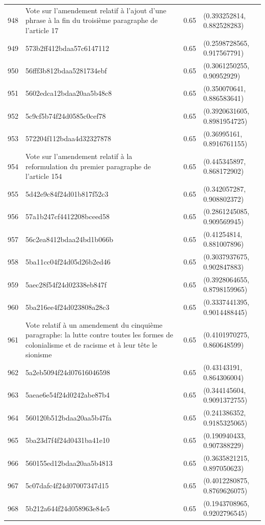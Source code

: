 \begin{table}[ht]
\begin{tabular}{rlrl}
  948 & Vote sur l'amendement relatif à l'ajout d'une phrase à la fin du troisième paragraphe de l'article 17 & 0.65 & (0.393252814, 0.882528283) \\ 
  949 & 573b2ff412bdaa57c6147112 & 0.65 & (0.2598728565, 0.917567791) \\ 
  950 & 56fff3b812bdaa5281734ebf & 0.65 & (0.3061250255, 0.90952929) \\ 
  951 & 5602edca12bdaa20aa5b48c8 & 0.65 & (0.350070641, 0.886583641) \\ 
  952 & 5c9cf5b74f24d0585c0cef78 & 0.65 & (0.3920631605, 0.8981954725) \\ 
  953 & 572204f112bdaa4d32327878 & 0.65 & (0.36995161, 0.8916761155) \\ 
  954 & Vote sur l'amendement relatif à la reformulation du premier paragraphe de l'article 154 & 0.65 & (0.445345897, 0.868172902) \\ 
  955 & 5d42e9c84f24d01b817f52c3 & 0.65 & (0.342057287, 0.908802372) \\ 
  956 & 57a1b247cf4412208bceed58 & 0.65 & (0.2861245085, 0.909569945) \\ 
  957 & 56c2ea8412bdaa24bd1b066b & 0.65 & (0.41254814, 0.881007896) \\ 
  958 & 5ba11cc04f24d05d26b2ed46 & 0.65 & (0.3037937675, 0.902847883) \\ 
  959 & 5aec28f54f24d02338eb847f & 0.65 & (0.3928064655, 0.8798159965) \\ 
  960 & 5ba216ee4f24d023808a28c3 & 0.65 & (0.3337441395, 0.9014488445) \\ 
  961 & Vote relatif à un amendement du cinquième paragraphe: la lutte contre toutes les formes de colonialisme et de racisme et à leur tête le sionisme & 0.65 & (0.4101970275, 0.860648599) \\ 
  962 & 5a2eb5094f24d07616046598 & 0.65 & (0.43143191, 0.864306004) \\ 
  963 & 5aeae6e54f24d0242abe87b4 & 0.65 & (0.344145604, 0.9091372755) \\ 
  964 & 560120b512bdaa20aa5b47fa & 0.65 & (0.241386352, 0.9185325065) \\ 
  965 & 5ba23d7f4f24d0431ba41e10 & 0.65 & (0.190940433, 0.907388229) \\ 
  966 & 560155ed12bdaa20aa5b4813 & 0.65 & (0.3635821215, 0.897050623) \\ 
  967 & 5c07dafc4f24d07007347d15 & 0.65 & (0.4012280875, 0.8769626075) \\ 
  968 & 5b212a644f24d058963e84e5 & 0.65 & (0.1943708965, 0.9202796545) \\ 

\end{tabular}
\end{table}
